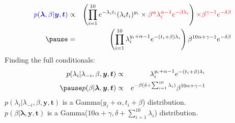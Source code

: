 \documentclass{beamer}
\begin{document}
\begin{frame}
\begin{eqnarray*}
\blue{p(\bm{\lambda}, \beta | \bm{y}, \bm{t})} &\propto& \left(
\prod_{i=1}^{10} e^{-\lambda_i t_i} (\lambda_i t_i)^{y_i} \times
\red{\beta^{\alpha} \lambda_i^{\alpha-1} e^{-\beta \lambda_i}} \right) \red{\times 
\beta^{\gamma-1} e^{-\delta \beta} }\\
\pause
&=& \left( \prod_{i=1}^{10} \lambda_i^{y_i + \alpha - 1} e^{-(t_i +
\beta)\lambda_i} \right) \beta^{10\alpha + \gamma - 1} e^{-\delta \beta}\\
\end{eqnarray*}
\pause
\medskip
Finding the full conditionals:
\pause
\begin{eqnarray*}
p(\lambda_i | \lambda_{-i}, \beta, \bm{y}, \bm{t}) &\propto& \lambda_i^{y_i + \alpha - 1} e^{-(t_i +
\beta)\lambda_i} \\
\pause
p(\beta | \bm{\lambda}, \bm{y}, \bm{t}) &\propto&  e^{-\beta
(\delta + \sum_{i=1}^{10} \lambda_i)} \beta^{10\alpha + \gamma - 1}\\
\end{eqnarray*}
\pause
$p(\lambda_i | \lambda_{-i}, \beta, \bm{y}, \bm{t})$ is a Gamma($y_i + \alpha, t_i + \beta$) distribution.\\
\pause
\bigskip
$p(\beta | \bm{\lambda}, \bm{y}, \bm{t})$ is a Gamma($10\alpha + \gamma, \delta + \sum_{i=1}^{10}
\lambda_i$) distribution.
\end{frame}
\end{document}
